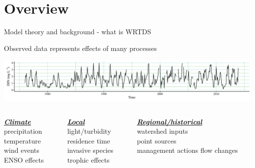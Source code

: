 \documentclass[xcolor=dvipsnames,serif]{beamer}\usepackage[]{graphicx}\usepackage[]{color}
\newcommand{\Bigtxt}[1]{\textbf{\textit{#1}}}
\begin{document}
\section{Overview}



\begin{frame}[t]{Model theory and background - what is WRTDS}{}
{\bf \centerline{Observed data represents effects of many processes}}
\vspace{0.15in}
\centerline{\includegraphics[width = \textwidth]{imgs/ts_ex.pdf}}
\vspace{0.15in}
\begin{columns}[t]
\begin{column}{0.3\textwidth}
{\bf \underline{\Bigtxt{Climate}}}\\
precipitation\\
temperature\\
wind events\\
ENSO effects
\end{column}
\begin{column}{0.3\textwidth}
{\bf \underline{\Bigtxt{Local}}}\\
light/turbidity\\
residence time\\
invasive species\\
trophic effects
\end{column}
\begin{column}{0.3\textwidth}
{\bf \underline{\Bigtxt{Regional/historical}}}\\
watershed inputs\\
point sources\\
management actions
flow changes
\end{column}
\end{columns}
\end{frame}
\end{document}
